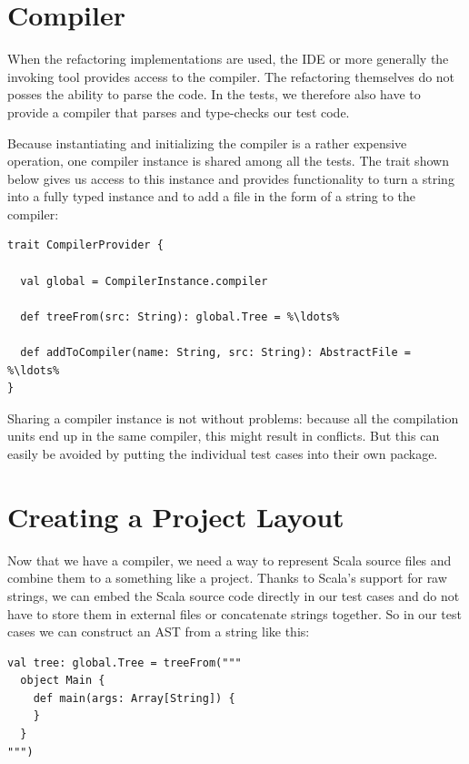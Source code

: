 \documentclass[10pt,a4paper,oneside]{scrreprt}
\begin{document}
\section{Compiler}

When the refactoring implementations are used, the IDE or more generally the invoking tool provides access to the compiler. The refactoring themselves do not posses the ability to parse the code. In the tests, we therefore also have to provide a compiler that parses and type-checks our test code.

Because instantiating and initializing the compiler is a rather expensive operation, one compiler instance is shared among all the tests. The  trait shown below gives us access to this instance and provides functionality to turn a string into a fully typed  instance and to add a file in the form of a string to the compiler:

\begin{lstlisting}
trait CompilerProvider {

  val global = CompilerInstance.compiler
    
  def treeFrom(src: String): global.Tree = %\ldots%
  
  def addToCompiler(name: String, src: String): AbstractFile = %\ldots%
}
\end{lstlisting}

Sharing a compiler instance is not without problems: because all the compilation units end up in the same compiler, this might result in conflicts. But this can easily be avoided by putting the individual test cases into their own package.

\section{Creating a Project Layout}

Now that we have a compiler, we need a way to represent Scala source files and combine them to a something like a project. Thanks to Scala's support for raw strings, we can embed the Scala source code directly in our test cases and do not have to store them in external files or concatenate strings together. So in our test cases we can construct an AST from a string like this:

\begin{lstlisting}
val tree: global.Tree = treeFrom("""
  object Main {
    def main(args: Array[String]) {
    }
  }
""")
\end{lstlisting}
\end{document}
